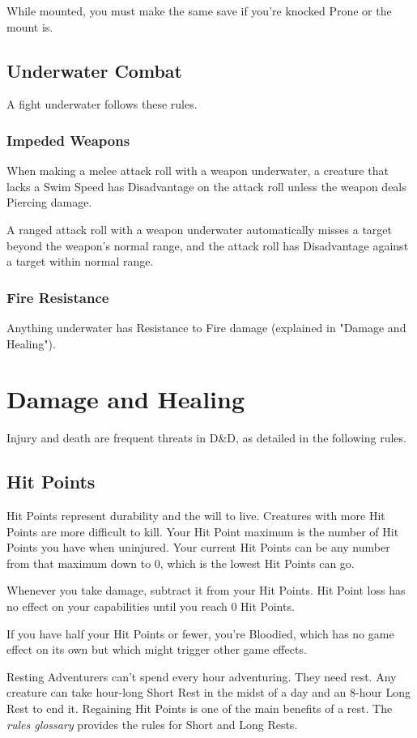 \documentclass[10pt,a4paper,twoside,bg=print,twocolumn,openany,nodeprecatedcode]{dndbook}
\begin{document}
While mounted, you must make the same save if you're knocked Prone or the mount is.

\subsection{Underwater Combat}
A fight underwater follows these rules.

\subsubsection{Impeded Weapons}
When making a melee attack roll with a weapon underwater, a creature that lacks a Swim Speed has Disadvantage on the attack roll unless the weapon deals Piercing damage.

A ranged attack roll with a weapon underwater automatically misses a target beyond the weapon's normal range, and the attack roll has Disadvantage against a target within normal range.

\subsubsection{Fire Resistance}
Anything underwater has Resistance to Fire damage (explained in "Damage and Healing").

\section{Damage and Healing}
Injury and death are frequent threats in D\&D, as detailed in the following rules.

\subsection{Hit Points}
Hit Points represent durability and the will to live. Creatures with more Hit Points are more difficult to kill. Your Hit Point maximum is the number of Hit Points you have when uninjured. Your current Hit Points can be any number from that maximum down to 0, which is the lowest Hit Points can go.

Whenever you take damage, subtract it from your Hit Points. Hit Point loss has no effect on your capabilities until you reach 0 Hit Points.

If you have half your Hit Points or fewer, you're Bloodied, which has no game effect on its own but which might trigger other game effects.

\begin{DndSidebar}[float=!b]{Resting}
Adventurers can't spend every hour adventuring. They need rest. Any creature can take hour-long Short Rest in the midst of a day and an 8-hour Long Rest to end it. Regaining Hit Points is one of the main benefits of a rest. The \textit{rules glossary} provides the rules for Short and Long Rests.



\end{DndSidebar}
\end{document}
